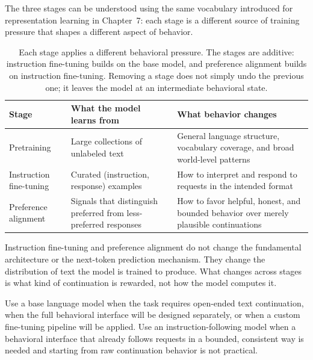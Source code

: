 The three stages can be understood using the same vocabulary introduced for representation learning in Chapter~7: each stage is a different source of training pressure that shapes a different aspect of behavior.

\begin{table}[t]
\centering
\small
\setlength{\tabcolsep}{4pt}
\begin{tabular}{p{2.36cm}p{3.2cm}p{4.38cm}}
\toprule
Stage & What the model learns from & What behavior changes \\
\midrule
Pretraining & Large collections of unlabeled text & General language structure, vocabulary coverage, and broad world-level patterns \\
Instruction fine-tuning & Curated (instruction, response) examples & How to interpret and respond to requests in the intended format \\
Preference alignment & Signals that distinguish preferred from less-preferred responses & How to favor helpful, honest, and bounded behavior over merely plausible continuations \\
\bottomrule
\end{tabular}
\caption{Each stage applies a different behavioral pressure. The stages are additive: instruction fine-tuning builds on the base model, and preference alignment builds on instruction fine-tuning. Removing a stage does not simply undo the previous one; it leaves the model at an intermediate behavioral state.}
\label{tab:instruction-pipeline-stages}
\end{table}

\begin{practicalnote}
Instruction fine-tuning and preference alignment do not change the fundamental architecture or the next-token prediction mechanism. They change the distribution of text the model is trained to produce. What changes across stages is what kind of continuation is rewarded, not how the model computes it.
\end{practicalnote}

\begin{decisionbox}
Use a base language model when the task requires open-ended text continuation, when the full behavioral interface will be designed separately, or when a custom fine-tuning pipeline will be applied. Use an instruction-following model when a behavioral interface that already follows requests in a bounded, consistent way is needed and starting from raw continuation behavior is not practical.
\end{decisionbox}

